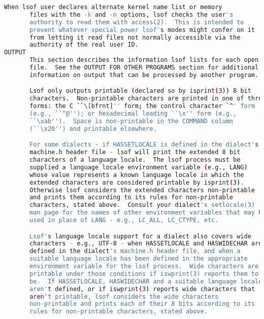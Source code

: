 {{\begin{lstlisting}[language=bash]
       When lsof user declares alternate kernel name list or memory
       files with the -k and -m options, lsof checks the user's
       authority to read them with access(2).  This is intended to
       prevent whatever special power lsof's modes might confer on it
       from letting it read files not normally accessible via the
       authority of the real user ID.
OUTPUT
       This section describes the information lsof lists for each open
       file.  See the OUTPUT FOR OTHER PROGRAMS section for additional
       information on output that can be processed by another program.

       Lsof only outputs printable (declared so by isprint(3)) 8 bit
       characters.  Non-printable characters are printed in one of three
       forms: the C ``\[bfrnt]'' form; the control character `^' form
       (e.g., ``^@''); or hexadecimal leading ``\x'' form (e.g.,
       ``\xab'').  Space is non-printable in the COMMAND column
       (``\x20'') and printable elsewhere.

       For some dialects - if HASSETLOCALE is defined in the dialect's
       machine.h header file - lsof will print the extended 8 bit
       characters of a language locale.  The lsof process must be
       supplied a language locale environment variable (e.g., LANG)
       whose value represents a known language locale in which the
       extended characters are considered printable by isprint(3).
       Otherwise lsof considers the extended characters non-printable
       and prints them according to its rules for non-printable
       characters, stated above.  Consult your dialect's setlocale(3)
       man page for the names of other environment variables that may be
       used in place of LANG - e.g., LC_ALL, LC_CTYPE, etc.

       Lsof's language locale support for a dialect also covers wide
       characters - e.g., UTF-8 - when HASSETLOCALE and HASWIDECHAR are
       defined in the dialect's machine.h header file, and when a
       suitable language locale has been defined in the appropriate
       environment variable for the lsof process.  Wide characters are
       printable under those conditions if iswprint(3) reports them to
       be.  If HASSETLOCALE, HASWIDECHAR and a suitable language locale
       aren't defined, or if iswprint(3) reports wide characters that
       aren't printable, lsof considers the wide characters
       non-printable and prints each of their 8 bits according to its
       rules for non-printable characters, stated above.


\end{lstlisting}}}
